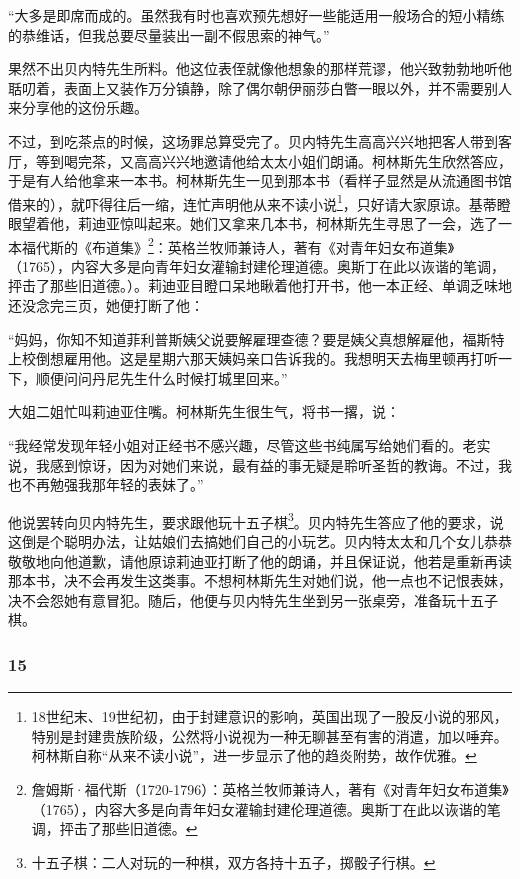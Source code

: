 \par “大多是即席而成的。虽然我有时也喜欢预先想好一些能适用一般场合的短小精练的恭维话，但我总要尽量装出一副不假思索的神气。”
\par 果然不出贝内特先生所料。他这位表侄就像他想象的那样荒谬，他兴致勃勃地听他聒叨着，表面上又装作万分镇静，除了偶尔朝伊丽莎白瞥一眼以外，并不需要别人来分享他的这份乐趣。
\par 不过，到吃茶点的时候，这场罪总算受完了。贝内特先生高高兴兴地把客人带到客厅，等到喝完茶，又高高兴兴地邀请他给太太小姐们朗诵。柯林斯先生欣然答应，于是有人给他拿来一本书。柯林斯先生一见到那本书（看样子显然是从流通图书馆借来的），就吓得往后一缩，连忙声明他从来不读小说\footnote{18世纪末、19世纪初，由于封建意识的影响，英国出现了一股反小说的邪风，特别是封建贵族阶级，公然将小说视为一种无聊甚至有害的消遣，加以唾弃。柯林斯自称“从来不读小说”，进一步显示了他的趋炎附势，故作优雅。}，只好请大家原谅。基蒂瞪眼望着他，莉迪亚惊叫起来。她们又拿来几本书，柯林斯先生寻思了一会，选了一本福代斯的《布道集》\footnote{詹姆斯·福代斯（1720-1796）：英格兰牧师兼诗人，著有《对青年妇女布道集》（1765），内容大多是向青年妇女灌输封建伦理道德。奥斯丁在此以诙谐的笔调，抨击了那些旧道德。}：英格兰牧师兼诗人，著有《对青年妇女布道集》（1765），内容大多是向青年妇女灌输封建伦理道德。奥斯丁在此以诙谐的笔调，抨击了那些旧道德。）。莉迪亚目瞪口呆地瞅着他打开书，他一本正经、单调乏味地还没念完三页，她便打断了他：
\par “妈妈，你知不知道菲利普斯姨父说要解雇理查德？要是姨父真想解雇他，福斯特上校倒想雇用他。这是星期六那天姨妈亲口告诉我的。我想明天去梅里顿再打听一下，顺便问问丹尼先生什么时候打城里回来。”
\par 大姐二姐忙叫莉迪亚住嘴。柯林斯先生很生气，将书一撂，说：
\par “我经常发现年轻小姐对正经书不感兴趣，尽管这些书纯属写给她们看的。老实说，我感到惊讶，因为对她们来说，最有益的事无疑是聆听圣哲的教诲。不过，我也不再勉强我那年轻的表妹了。”
\par 他说罢转向贝内特先生，要求跟他玩十五子棋\footnote{十五子棋：二人对玩的一种棋，双方各持十五子，掷骰子行棋。}。贝内特先生答应了他的要求，说这倒是个聪明办法，让姑娘们去搞她们自己的小玩艺。贝内特太太和几个女儿恭恭敬敬地向他道歉，请他原谅莉迪亚打断了他的朗诵，并且保证说，他若是重新再读那本书，决不会再发生这类事。不想柯林斯先生对她们说，他一点也不记恨表妹，决不会怨她有意冒犯。随后，他便与贝内特先生坐到另一张桌旁，准备玩十五子棋。


\subsubsection*{15}

